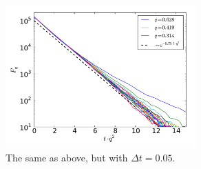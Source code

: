 \documentclass[a4paper,11pt]{scrartcl}
\begin{document}
\begin{figure}[h]
 \centering
  \includegraphics[width=0.65\textwidth]{../plot/relax_N10000000_005.pdf}
 \caption{The same as above, but with $\Delta t=0.05$.}
 \label{fig:relax_dt0.05}
\end{figure}
\end{document}
